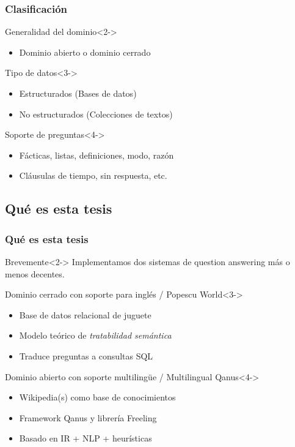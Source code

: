 \begin{frame}
  \frametitle{Clasificación}
  \begin{block}{Generalidad del dominio}<2->
    \begin{itemize}
      \item Dominio abierto o dominio cerrado
    \end{itemize}
  \end{block}
  \begin{block}{Tipo de datos}<3->
    \begin{itemize}
      \item Estructurados (Bases de datos)
      \item No estructurados (Colecciones de textos)
    \end{itemize}
  \end{block}
  \begin{block}{Soporte de preguntas}<4->
    \begin{itemize}
      \item Fácticas, listas, definiciones, modo, razón
      \item Cláusulas de tiempo, sin respuesta, etc.
    \end{itemize}
  \end{block}
\end{frame}


\subsection{Qué es esta tesis}

\begin{frame}
  \frametitle{Qué es esta tesis}
    \begin{block}{Brevemente}<2->
      Implementamos dos sistemas de question answering más o menos decentes.
    \end{block}
    \begin{exampleblock}{Dominio cerrado con soporte para inglés / Popescu World}<3->
      \begin{itemize}
          \item Base de datos relacional de juguete
          \item Modelo teórico de \textit{tratabilidad semántica}
          \item Traduce preguntas a consultas SQL
      \end{itemize}
    \end{exampleblock}
    \begin{alertblock}{Dominio abierto con soporte multilingüe / Multilingual Qanus}<4->
      \begin{itemize}
          \item Wikipedia(s) como base de conocimientos
          \item Framework Qanus y librería Freeling
          \item Basado en IR + NLP + heurísticas
      \end{itemize}
    \end{alertblock}
\end{frame}